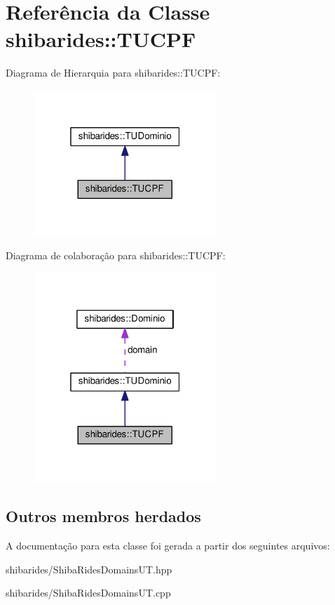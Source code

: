 \hypertarget{classshibarides_1_1TUCPF}{}\section{Referência da Classe shibarides\+:\+:T\+U\+C\+PF}
\label{classshibarides_1_1TUCPF}


Diagrama de Hierarquia para shibarides\+:\+:T\+U\+C\+PF\+:\nopagebreak
\begin{figure}[H]
\begin{center}
\leavevmode
\includegraphics[width=196pt]{classshibarides_1_1TUCPF__inherit__graph}
\end{center}
\end{figure}


Diagrama de colaboração para shibarides\+:\+:T\+U\+C\+PF\+:\nopagebreak
\begin{figure}[H]
\begin{center}
\leavevmode
\includegraphics[width=196pt]{classshibarides_1_1TUCPF__coll__graph}
\end{center}
\end{figure}
\subsection*{Outros membros herdados}


A documentação para esta classe foi gerada a partir dos seguintes arquivos\+:\begin{DoxyCompactItemize}
\item 
shibarides/Shiba\+Rides\+Domains\+U\+T.\+hpp\item 
shibarides/Shiba\+Rides\+Domains\+U\+T.\+cpp\end{DoxyCompactItemize}
